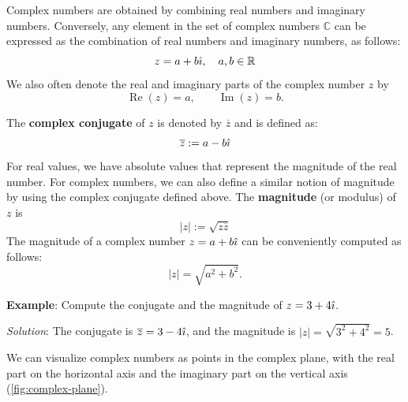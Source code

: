 Complex numbers are obtained by combining real numbers and imaginary numbers.
Conversely, any element in the set of complex numbers $\mathbb{C}$ can be expressed as the combination of real numbers and imaginary numbers, as follows:
\begin{equation*}
    z = a + b \hat{\imath}, \quad a, b \in \mathbb{R}
\end{equation*}
We also often denote the real and imaginary parts of the complex number $ z $ by
\begin{equation*}
    \operatorname{Re}(z) = a, \qquad \operatorname{Im}(z) = b.
\end{equation*}

The \textbf{complex conjugate} of $ z $ is denoted by $\overline{z}$ and is defined as:
\begin{equation*}
  \overline{z} := a - b \hat{\imath}
\end{equation*}
For real values, we have absolute values that represent the magnitude of the real number.
For complex numbers, we can also define a similar notion of magnitude by using the complex conjugate defined above.
The \textbf{magnitude} (or modulus) of $ z $ is
\begin{equation*}
  |z| := \sqrt{z \overline{z}}
\end{equation*}
The magnitude of a complex number $ z = a + b\hat{\imath} $ can be conveniently computed as follows:
\begin{equation*}
  |z| = \sqrt{a^2 + b^2}.
\end{equation*}

\begin{exampleBox}
    \textbf{Example}: Compute the conjugate and the magnitude of $ z = 3 + 4\hat{\imath} $.

    \emph{Solution}: The conjugate is $ \overline{z} = 3 - 4\hat{\imath} $, and the magnitude is $ |z| = \sqrt{3^2 + 4^2} = 5 $.
\end{exampleBox}

We can visualize complex numbers as points in the complex plane, with the real part on the horizontal axis and the imaginary part on the vertical axis (\autoref{fig:complex-plane}).

